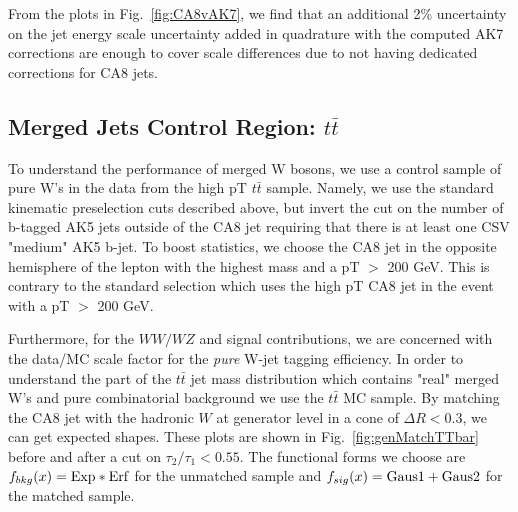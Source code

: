 From the plots in Fig.~\ref{fig:CA8vAK7}, we find that an additional 2\% uncertainty on the jet energy scale uncertainty added in quadrature
with the computed AK7 corrections are enough to cover scale differences due to not having dedicated corrections for CA8 jets.

\subsection{Merged Jets Control Region: $t\bar{t}$}
\label{sec:ttbar_merged}

To understand the performance of merged W bosons, we use a control sample of pure W's in the data from the high pT $t\bar{t}$ sample. Namely, we use the standard kinematic preselection cuts described above, but invert the cut on the number of b-tagged AK5 jets outside of the CA8 jet requiring that there is at least one CSV "medium" AK5 b-jet.
To boost statistics, we choose the CA8 jet in the opposite hemisphere of the lepton with the highest mass and a pT $>$ 200 GeV.
This is contrary to the standard selection which uses the high pT CA8 jet in the event with a pT $>$ 200 GeV.

Furthermore, for the $WW/WZ$ and signal contributions, we are concerned with the data/MC scale factor for the {\it pure} W-jet
tagging efficiency.  
In order to understand the part of the $t\bar{t}$ jet mass distribution which contains "real" merged W's and pure combinatorial background
we use the $t\bar{t}$ MC sample. 
By matching the CA8 jet with the hadronic $W$ at generator level in a cone of $\Delta R < 0.3$, we can get expected shapes.  
These plots are shown in Fig.~\ref{fig:genMatchTTbar} before and after a cut on $\tau_2/\tau_1<0.55$.  
The functional forms we choose are $f_{bkg}(x) = {\rm Exp}*{\rm Erf}$ for the unmatched sample and $f_{sig}(x) = {\rm Gaus1} + {\rm Gaus2}$ for the matched sample.

